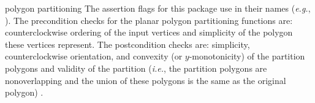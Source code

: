 \begin{ccPackage}{polygon partitioning}
The assertion flags for this package use  in their names
({\em e.g.}, ).
The precondition checks for the planar polygon partitioning functions
are:  counterclockwise ordering of the input vertices and simplicity of the 
polygon these vertices represent.
The postcondition checks are:  simplicity, counterclockwise orientation,
and convexity (or $y$-monotonicity) of the partition polygons
and validity of the partition ({\em i.e.}, the partition polygons are 
nonoverlapping and the union of these polygons is the same as the
original polygon)
.
\end{ccPackage}
